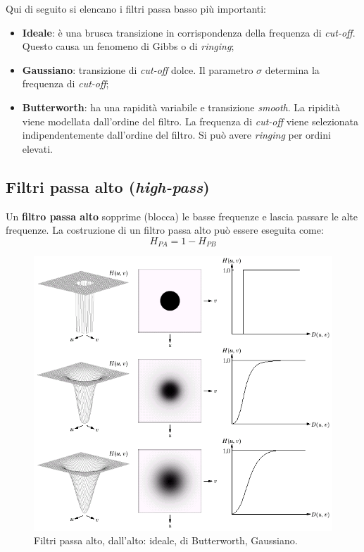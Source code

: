 \documentclass[a4paper]{article}
\begin{document}
	Qui di seguito si elencano i filtri passa basso più importanti:
	\begin{itemize}
		\item \textbf{Ideale}: è una brusca transizione in corrispondenza della frequenza di \emph{cut-off}. Questo causa un fenomeno di Gibbs o di \emph{ringing};
		
		\item \textbf{Gaussiano}: transizione di \emph{cut-off} dolce. Il parametro $\sigma$ determina la frequenza di \emph{cut-off};
		
		\item \textbf{Butterworth}: ha una rapidità variabile e transizione \emph{smooth}. La ripidità viene modellata dall'ordine del filtro. La frequenza di \emph{cut-off} viene selezionata indipendentemente dall'ordine del filtro. Si può avere \emph{ringing} per ordini elevati.
	\end{itemize}\newpage
	
	\subsection{Filtri passa alto (\emph{high-pass})}
	
	Un \textcolor{Red3}{\textbf{filtro passa alto}} sopprime (blocca) le basse frequenze e lascia passare le alte frequenze. La costruzione di un filtro passa alto può essere eseguita come:
	\begin{equation*}
		H_{PA} = 1 - H_{PB}
	\end{equation*}
	\begin{figure}[!htp]
		\centering
		\includegraphics[width=.9\textwidth]{img/filtri_passa_alto.png}
		\caption{Filtri passa alto, dall'alto: ideale, di Butterworth, Gaussiano.}
	\end{figure}\newpage
	
\end{document}
